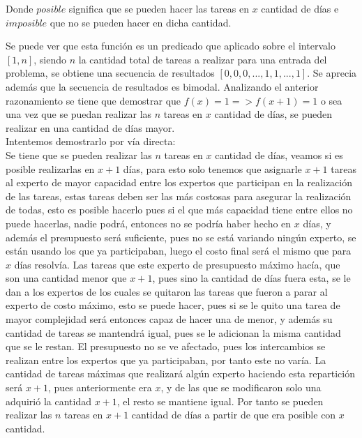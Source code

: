 \documentclass[10pt,letterpaper]{article}
\begin{document}
{ 	Donde $posible$ significa que se pueden hacer las tareas en $x$ cantidad de d\'ias e $imposible$ que no se pueden hacer en dicha cantidad.
 	
 	Se puede ver que esta funci\'on es un predicado que aplicado sobre el intervalo $[1, n]$, siendo $n$ la cantidad total de tareas a realizar para una entrada del problema, se obtiene una secuencia de resultados $[0,0,0,...,1,1,...,1]$. Se aprecia adem\'as que la secuencia de resultados es bimodal. Analizando el anterior razonamiento se tiene que demostrar que $f(x) = 1 => f(x + 1) = 1 $ o sea una vez que se puedan realizar las $n$ tareas en $x$ cantidad de d\'ias, se pueden realizar en una cantidad de d\'ias mayor.\\
 	
 	Intentemos demostrarlo por v\'ia directa:\\
 	Se tiene que se pueden realizar las $n$ tareas en $x$ cantidad de d\'ias, veamos si es posible realizarlas en $x + 1$ d\'ias, para esto solo tenemos que asignarle $x + 1$ tareas al experto de mayor capacidad entre los expertos que participan en la realizaci\'on de las tareas, estas tareas deben ser las m\'as costosas para asegurar la realizaci\'on de todas, esto es posible hacerlo pues si el que m\'as capacidad tiene entre ellos no puede hacerlas, nadie podr\'a, entonces no se podr\'ia haber hecho en $x$ d\'ias, y adem\'as el presupuesto ser\'a suficiente, pues no se est\'a variando ning\'un experto, se est\'an usando los que ya participaban, luego el costo final ser\'a el mismo que para $x$ d\'ias resolv\'ia. Las tareas que este experto de presupuesto m\'aximo hac\'ia, que son una cantidad menor que $x+1$, pues sino la cantidad de d\'ias fuera esta, se le dan a los expertos de los cuales se quitaron las tareas que fueron a parar al experto de costo m\'aximo, esto se puede hacer, pues si se le quito una tarea de mayor complejidad ser\'a entonces capaz de hacer una de menor, y adem\'as su cantidad de tareas se mantendr\'a igual, pues se le adicionan la misma cantidad que se le restan. El presupuesto no se ve afectado, pues los intercambios se realizan entre los expertos que ya participaban, por tanto este no var\'ia. La cantidad de tareas m\'aximas que realizar\'a alg\'un experto haciendo esta repartici\'on ser\'a $x+1$, pues anteriormente era $x$, y de las que se modificaron solo una adquiri\'o la cantidad $x+1$, el resto se mantiene igual. Por tanto se pueden realizar las $n$ tareas en $x+1$ cantidad de d\'ias a partir de que era posible con $x$ cantidad.
 	
}
\end{document}

